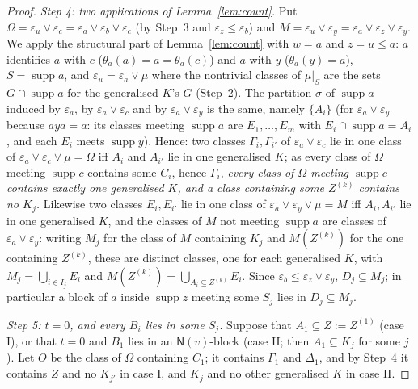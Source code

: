 \documentclass[11pt]{amsart}
\theoremstyle{definition}
\newcommand{\supp}{\operatorname{supp}}
\newcommand{\N}{\mathsf{N}}
\begin{document}
\begin{proof}
\smallskip\emph{Step 4: two applications of Lemma~\ref{lem:count}.} Put $\Omega=\varepsilon_u\vee\varepsilon_c=\varepsilon_a\vee\varepsilon_b\vee\varepsilon_c$ (by Step~3 and $\varepsilon_z\le\varepsilon_b$) and $M=\varepsilon_u\vee\varepsilon_y=\varepsilon_a\vee\varepsilon_z\vee\varepsilon_y$. We apply the structural part of Lemma~\ref{lem:count} with $w=a$ and $z=u\le a$: $a$ identifies $a$ with $c$ ($\theta_a(a)=a=\theta_a(c)$) and $a$ with $y$ ($\theta_a(y)=a$), $S=\supp a$, and $\varepsilon_u=\varepsilon_a\vee\mu$ where the nontrivial classes of $\mu|_S$ are the sets $G\cap\supp a$ for the generalised $K$'s $G$ (Step~2). The partition $\sigma$ of $\supp a$ induced by $\varepsilon_a$, by $\varepsilon_a\vee\varepsilon_c$ and by $\varepsilon_a\vee\varepsilon_y$ is the same, namely $\{A_i\}$ (for $\varepsilon_a\vee\varepsilon_y$ because $aya=a$: its classes meeting $\supp a$ are $E_1,\dots,E_m$ with $E_i\cap\supp a=A_i$, and each $E_i$ meets $\supp y$). Hence: two classes $\Gamma_i,\Gamma_{i'}$ of $\varepsilon_a\vee\varepsilon_c$ lie in one class of $\varepsilon_a\vee\varepsilon_c\vee\mu=\Omega$ iff $A_i$ and $A_{i'}$ lie in one generalised $K$; as every class of $\Omega$ meeting $\supp c$ contains some $C_i$, hence $\Gamma_i$, \emph{every class of $\Omega$ meeting $\supp c$ contains exactly one generalised $K$, and a class containing some $Z^{(k)}$ contains no $K_j$.} Likewise two classes $E_i,E_{i'}$ lie in one class of $\varepsilon_a\vee\varepsilon_y\vee\mu=M$ iff $A_i,A_{i'}$ lie in one generalised $K$, and the classes of $M$ not meeting $\supp a$ are classes of $\varepsilon_a\vee\varepsilon_y$: writing $M_j$ for the class of $M$ containing $K_j$ and $M(Z^{(k)})$ for the one containing $Z^{(k)}$, these are distinct classes, one for each generalised $K$, with $M_j=\bigcup_{i\in I_j}E_i$ and $M(Z^{(k)})=\bigcup_{A_i\subseteq Z^{(k)}}E_i$. Since $\varepsilon_b\le\varepsilon_z\vee\varepsilon_y$, $D_j\subseteq M_j$; in particular a block of $a$ inside $\supp z$ meeting some $S_j$ lies in $D_j\subseteq M_j$.

\smallskip\emph{Step 5: $t=0$, and every $B_i$ lies in some $S_j$.} Suppose that $A_1\subseteq Z:=Z^{(1)}$ (case I), or that $t=0$ and $B_1$ lies in an $\N(v)$-block (case II; then $A_1\subseteq K_j$ for some $j$). Let $O$ be the class of $\Omega$ containing $C_1$; it contains $\Gamma_1$ and $\Delta_1$, and by Step~4 it contains $Z$ and no $K_{j'}$ in case I, and $K_j$ and no other generalised $K$ in case II.


\end{proof}
\end{document}
